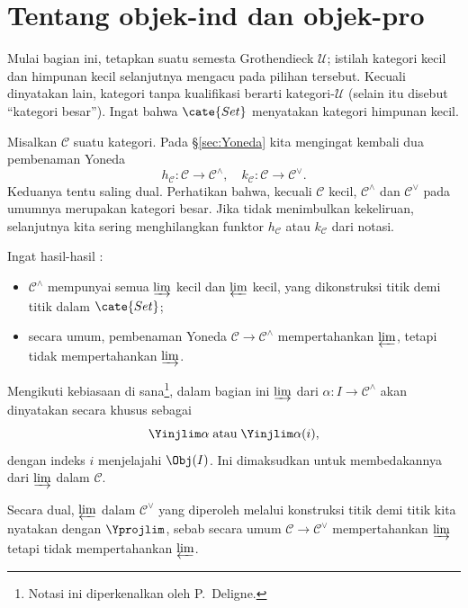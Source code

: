 \section{Tentang objek-ind dan objek-pro}\label{sec:ind-pro}
Mulai bagian ini, tetapkan suatu semesta Grothendieck $\mathcal{U}$; istilah
kategori kecil dan himpunan kecil selanjutnya mengacu pada pilihan tersebut.
Kecuali dinyatakan lain, kategori tanpa kualifikasi berarti
kategori-$\mathcal{U}$ (selain itu disebut ``kategori besar''). Ingat bahwa
$\cate{Set}$ menyatakan kategori himpunan kecil.

Misalkan $\mathcal{C}$ suatu kategori. Pada \S\ref{sec:Yoneda} kita mengingat kembali dua pembenaman Yoneda
\[ h_{\mathcal{C}}: \mathcal{C}\to \mathcal{C}^\wedge, \quad k_{\mathcal{C}}: \mathcal{C} \to \mathcal{C}^\vee. \]
Keduanya tentu saling dual. Perhatikan bahwa, kecuali $\mathcal{C}$ kecil, $\mathcal{C}^\wedge$ dan $\mathcal{C}^\vee$ pada umumnya merupakan kategori besar. Jika tidak menimbulkan kekeliruan, selanjutnya kita sering menghilangkan funktor $h_{\mathcal{C}}$ atau $k_{\mathcal{C}}$ dari notasi.

Ingat hasil-hasil \cite[Proposisi 2.7.8, 2.7.9]{Li1}:
\begin{itemize}
	\item $\mathcal{C}^\wedge$ mempunyai semua $\varinjlim$ kecil dan $\varprojlim$ kecil, yang dikonstruksi titik demi titik dalam $\cate{Set}$;
	\item secara umum, pembenaman Yoneda $\mathcal{C}\to \mathcal{C}^\wedge$ mempertahankan $\varprojlim$, tetapi tidak mempertahankan $\varinjlim$.
\end{itemize}
Mengikuti kebiasaan di sana\footnote{Notasi ini diperkenalkan oleh P.\ Deligne.}, dalam bagian ini $\varinjlim$ dari $\alpha:I\to\mathcal{C}^\wedge$ akan dinyatakan secara khusus sebagai
\[ \Yinjlim \alpha \;\text{atau}\; \Yinjlim \alpha(i), \]
dengan indeks $i$ menjelajahi $\Obj(I)$. Ini dimaksudkan untuk membedakannya dari $\varinjlim$ dalam $\mathcal{C}$.

Secara dual, $\varprojlim$ dalam $\mathcal{C}^\vee$ yang diperoleh melalui konstruksi titik demi titik kita nyatakan dengan $\Yprojlim$, sebab secara umum $\mathcal{C}\to\mathcal{C}^\vee$ mempertahankan $\varinjlim$ tetapi tidak mempertahankan $\varprojlim$.

